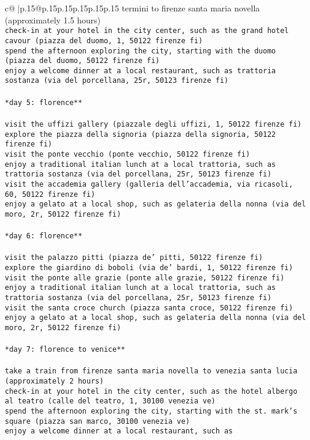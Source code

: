 \documentclass{article}
\begin{document}
{\begin{supertabular}{c@{$\;$}|p{.15\linewidth}@{}p{.15\linewidth}p{.15\linewidth}p{.15\linewidth}p{.15\linewidth}p{.15\linewidth}}
{{{termini to firenze santa maria novella (approximately 1.5 hours)\\ \tt * check-in at your hotel in the city center, such as the grand hotel cavour (piazza del duomo, 1, 50122 firenze fi)\\ \tt * spend the afternoon exploring the city, starting with the duomo (piazza del duomo, 50122 firenze fi)\\ \tt * enjoy a welcome dinner at a local restaurant, such as trattoria sostanza (via del porcellana, 25r, 50123 firenze fi)\\ \tt \\ \tt **day 5: florence**\\ \tt \\ \tt * visit the uffizi gallery (piazzale degli uffizi, 1, 50122 firenze fi)\\ \tt * explore the piazza della signoria (piazza della signoria, 50122 firenze fi)\\ \tt * visit the ponte vecchio (ponte vecchio, 50122 firenze fi)\\ \tt * enjoy a traditional italian lunch at a local trattoria, such as trattoria sostanza (via del porcellana, 25r, 50123 firenze fi)\\ \tt * visit the accademia gallery (galleria dell'accademia, via ricasoli, 60, 50122 firenze fi)\\ \tt * enjoy a gelato at a local shop, such as gelateria della nonna (via del moro, 2r, 50122 firenze fi)\\ \tt \\ \tt **day 6: florence**\\ \tt \\ \tt * visit the palazzo pitti (piazza de' pitti, 50122 firenze fi)\\ \tt * explore the giardino di boboli (via de' bardi, 1, 50122 firenze fi)\\ \tt * visit the ponte alle grazie (ponte alle grazie, 50122 firenze fi)\\ \tt * enjoy a traditional italian lunch at a local trattoria, such as trattoria sostanza (via del porcellana, 25r, 50123 firenze fi)\\ \tt * visit the santa croce church (piazza santa croce, 50122 firenze fi)\\ \tt * enjoy a gelato at a local shop, such as gelateria della nonna (via del moro, 2r, 50122 firenze fi)\\ \tt \\ \tt **day 7: florence to venice**\\ \tt \\ \tt * take a train from firenze santa maria novella to venezia santa lucia (approximately 2 hours)\\ \tt * check-in at your hotel in the city center, such as the hotel albergo al teatro (calle del teatro, 1, 30100 venezia ve)\\ \tt * spend the afternoon exploring the city, starting with the st. mark's square (piazza san marco, 30100 venezia ve)\\ \tt * enjoy a welcome dinner at a local restaurant, such as }}}
\end{supertabular}}
\end{document}
